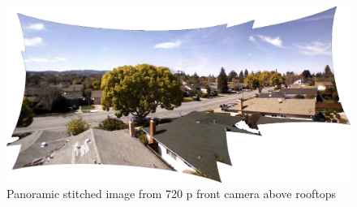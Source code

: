 \begin{figure}[H]
  \caption{Panoramic stitched image from 720 p front camera above rooftops}
  \label{fig:StellingStitch}
  \centering
    \includegraphics[width=\textwidth]{illustrations/maps/stelling}
\end{figure}


